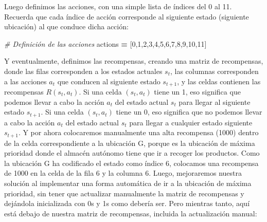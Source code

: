 \documentclass[
]{book}
\newenvironment{Shaded}{\begin{snugshade}}{\end{snugshade}}
\newcommand{\CommentTok}[1]{\textcolor[rgb]{0.56,0.35,0.01}{\textit{#1}}}
\newcommand{\DecValTok}[1]{\textcolor[rgb]{0.00,0.00,0.81}{#1}}
\newcommand{\NormalTok}[1]{#1}
\newcommand{\OperatorTok}[1]{\textcolor[rgb]{0.81,0.36,0.00}{\textbf{#1}}}
\begin{document}
Luego definimos las acciones, con una simple lista de índices del 0 al 11. Recuerda que cada índice de acción corresponde al siguiente estado (siguiente ubicación) al que conduce dicha acción:

\begin{Shaded}
\begin{Highlighting}[]
\CommentTok{\# Definición de las acciones}
\NormalTok{actions }\OperatorTok{=}\NormalTok{ [}\DecValTok{0}\NormalTok{,}\DecValTok{1}\NormalTok{,}\DecValTok{2}\NormalTok{,}\DecValTok{3}\NormalTok{,}\DecValTok{4}\NormalTok{,}\DecValTok{5}\NormalTok{,}\DecValTok{6}\NormalTok{,}\DecValTok{7}\NormalTok{,}\DecValTok{8}\NormalTok{,}\DecValTok{9}\NormalTok{,}\DecValTok{10}\NormalTok{,}\DecValTok{11}\NormalTok{]}
\end{Highlighting}
\end{Shaded}

Y eventualmente, definimos las recompensas, creando una matriz de recompensas, donde las filas corresponden a los estados actuales \(s_t\), las columnas corresponden a las acciones \(a_t\) que conducen al siguiente estado \(s_{t + 1}\), y las celdas contienen las recompensas \(R(s_t, a_t)\). Si una celda \((s_t, a_t)\) tiene un 1, eso significa que podemos llevar a cabo la acción \(a_t\) del estado actual \(s_t\) para llegar al siguiente estado \(s_{t + 1}\). Si una celda \((s_t, a_t)\) tiene un 0, eso significa que no podemos llevar a cabo la acción \(a_t\) del estado actual \(s_t\) para llegar a cualquier estado siguiente \(s_{t + 1}\). Y por ahora colocaremos manualmente una alta recompensa (1000) dentro de la celda correspondiente a la ubicación G, porque es la ubicación de máxima prioridad donde el almacén autónomo tiene que ir a recoger los productos. Como la ubicación G ha codificado el estado como índice 6, colocamos una recompensa de 1000 en la celda de la fila 6 y la columna 6. Luego, mejoraremos nuestra solución al implementar una forma automática de ir a la ubicación de máxima prioridad, sin tener que actualizar manualmente la matriz de recompensas y dejándola inicializada con 0s y 1s como debería ser. Pero mientras tanto, aquí está debajo de nuestra matriz de recompensas, incluida la actualización manual:
\end{document}
